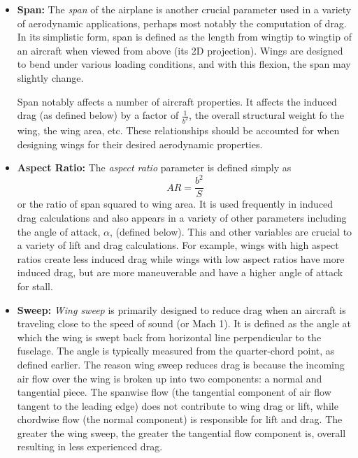 \documentclass{article}
\begin{document}
\begin{itemize}
    \item[] \textbf{Span:} The \textit{span} of the airplane is another crucial parameter used in a variety of 
    aerodynamic applications, perhaps most notably the computation of drag. In its simplistic form, span is defined
    as the length from wingtip to wingtip of an aircraft when viewed from above (its 2D projection). Wings are designed to
    bend under various loading conditions, and with this flexion, the span may slightly change.

    Span notably affects a number of aircraft properties. It affects the induced drag (as defined below) by a factor
    of $\frac{1}{b^2}$, the overall structural weight fo the wing, the wing area, etc. These relationships
    should be accounted for when designing wings for their desired aerodynamic properties.

    \item[] \textbf{Aspect Ratio:} The \textit{aspect ratio} parameter is defined simply as
    \begin{equation}
    AR = \frac{b^2}{S}
    \end{equation}
    or the ratio of span squared to wing area. It is used frequently in induced drag calculations
    and also appears in a variety of other parameters including the angle of attack, $\alpha$, (defined below).
    This and other variables are crucial to a variety of lift and drag calculations. For example, wings with high aspect ratios create
    less induced drag while wings with low aspect ratios have more induced drag, but are more maneuverable and have a higher angle of attack for stall.

    \item[] \textbf{Sweep:} \textit{Wing sweep} is primarily designed to reduce drag when an aircraft is traveling
    close to the speed of sound (or Mach 1). It is defined as the angle at which the wing is swept back from horizontal
    line perpendicular to the fuselage. The angle is typically measured from the quarter-chord point, as defined earlier. The reason
    wing sweep reduces drag is because the incoming air flow over the wing is broken up into two components: a normal and tangential piece.
    The spanwise flow (the tangential component of air flow tangent to the leading edge) does not contribute to 
    wing drag or lift, while chordwise flow (the normal component) is responsible for lift and drag. The greater the wing sweep, the greater
    the tangential flow component is, overall resulting in less experienced drag.


\end{itemize}
\end{document}
